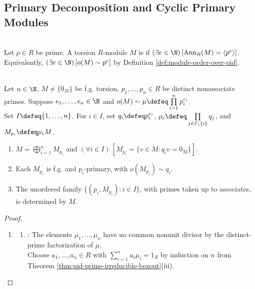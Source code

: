 \subsection{Primary Decomposition and Cyclic Primary Modules}

\begin{definition} \label{def:primary-module-over-pid} \\
Let $p\in R$ be prime. A torsion $R$-module $M$ is  if $(\exists e\in\N)\,[\operatorname{Ann}_R(M)=\langle p^e\rangle]$.\\
Equivalently, $(\exists e\in\N)\,[o(M)\sim p^e]$ by Definition \ref{def:module-order-over-pid}.
\end{definition}

\begin{theorem} \label{thm:primary-decomposition-pid-modules} \\
Let $n\in\N$, $M\neq\{0_M\}$ be f.g. torsion, $p_1,\ldots,p_n\in R$ be distinct nonassociate primes. Suppose $e_1,\ldots,e_n\in\N$ and $o(M)\sim\mu\defeq\prod\limits_{i=1}^np_i^{e_i}$.\\
Set $I\defeq\{1,\ldots,n\}$. For $i\in I$, set $q_i\defeq p_i^{e_i}$, $\mu_i\defeq\prod\limits_{j\in I\setminus\{i\}}q_j$, and $M_{p_i}\defeq\mu_iM$.
\begin{enumerate}[label=(\roman*)]
\setlength{\itemsep}{0pt}
\item $M=\bigoplus\limits_{i=1}^nM_{p_i}$ and $(\forall i\in I)\,[M_{p_i}=\{v\in M:q_iv=0_M\}]$.
\item Each $M_{p_i}$ is f.g. and $p_i$-primary, with $o(M_{p_i})\sim q_i$.
\item The unordered family $\{(p_i,M_{p_i}):i\in I\}$, with primes taken up to associates, is determined by $M$.
\end{enumerate}
\begin{proof}
\begin{enumerate}[label=(\roman*)]
\setlength{\itemsep}{0pt}
\item
\begin{enumerate}[label=(\alph*)]
\setlength{\itemsep}{0pt}
\item {}: The elements $\mu_1,\ldots,\mu_n$ have no common nonunit divisor by the distinct-prime factorization of $\mu$.\\
Choose $a_1,\ldots,a_n\in R$ with $\sum\limits_{i=1}^na_i\mu_i=1_R$ by induction on $n$ from Theorem \ref{thm:pid-prime-irreducible-bezout}(iii).\\

\end{enumerate}
\end{enumerate}
\end{proof}
\end{theorem}
